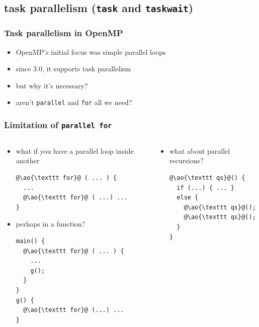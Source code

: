\documentclass[12pt,dvipdfmx]{beamer}
\newcommand{\ao}[1]{{\color{blue}#1}}
\begin{document}
\subsection{task parallelism ({\tt task} and {\tt taskwait})}

\begin{frame}[fragile]
\frametitle{Task parallelism in OpenMP}
\begin{itemize}
\item OpenMP's initial focus was simple parallel loops
\item since 3.0, it supports task parallelism
\item but why it's necessary?
\item aren't \texttt{parallel} and \texttt{for} all we need?
\end{itemize}
\end{frame}

\begin{frame}[fragile]
\frametitle{Limitation of \texttt{parallel for}}
\begin{columns}
\begin{column}{0.5\textwidth}
\begin{itemize}
\item what if you have a parallel loop inside another
\begin{lstlisting}
@\ao{\texttt for}@ ( ... ) {
  ...
  @\ao{\texttt for}@ ( ...) ...
}
\end{lstlisting}

\item perhaps in a function?
\begin{lstlisting}
main() {
  @\ao{\texttt for}@ ( ... ) {
    ...
    g();
  }
}
g() { 
  @\ao{\texttt for}@ (...) ...
}
\end{lstlisting}
\end{itemize}
\end{column}
  
\begin{column}{0.5\textwidth}
\begin{itemize}
\item what about parallel recursions?
\begin{lstlisting}
@\ao{\texttt qs}@() {
  if (...) { ... }
  else {
    @\ao{\texttt qs}@();
    @\ao{\texttt qs}@();
  }
}      
\end{lstlisting}
\end{itemize}

\begin{center}
\end{center}

\end{column}
\end{columns}
\end{frame}
\end{document}
